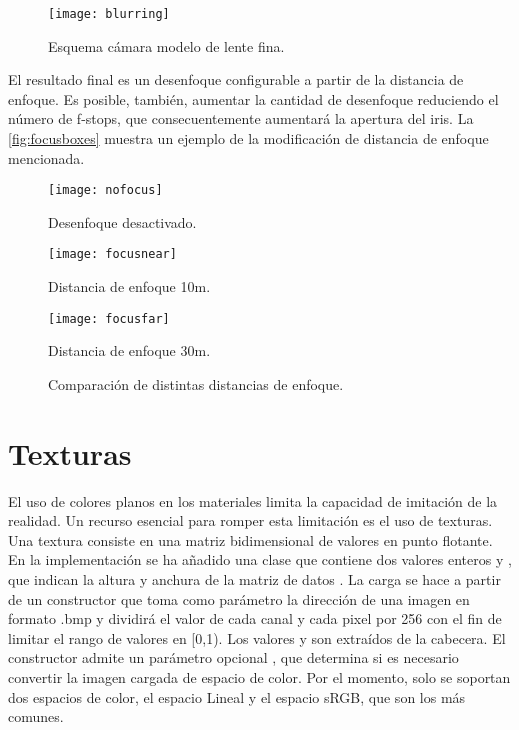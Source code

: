 \begin{figure}[H]
	\centering
	\texttt{[image: blurring]}
	\caption{Esquema cámara modelo de lente fina.}
	\label{fig:thinlensecamera}
\end{figure}

El resultado final es un desenfoque configurable a partir de la distancia de enfoque. Es posible, también, aumentar la cantidad de desenfoque reduciendo el número de f-stops, que consecuentemente aumentará la apertura del iris. La \autoref{fig:focusboxes} muestra un ejemplo de la modificación de distancia de enfoque mencionada.

\begin{figure}[H]
	\centering
  \begin{minipage}[b]{0.3\textwidth}
	\texttt{[image: nofocus]}
	\caption{Desenfoque desactivado.}
  \end{minipage}
  \hfill
  \begin{minipage}[b]{0.3\textwidth}
	\texttt{[image: focusnear]}
	\caption{Distancia de enfoque 10m.}
  \end{minipage}
  	\hfill
  \begin{minipage}[b]{0.3\textwidth}
	\texttt{[image: focusfar]}
	\caption{Distancia de enfoque 30m.}
  \end{minipage}
\caption{Comparación de distintas distancias de enfoque.}
\label{fig:focusboxes}
\end{figure}
	
		
\section{Texturas}
	
El uso de colores planos en los materiales limita la capacidad de imitación de la realidad. Un recurso esencial para romper esta limitación es el uso de texturas. Una textura consiste en una matriz bidimensional de valores en punto flotante. En la implementación se ha añadido una clase  que contiene dos valores enteros  y , que indican la altura y anchura de la matriz de datos . La carga se hace a partir de un constructor que toma como parámetro la dirección de una imagen en formato .bmp y dividirá el valor de cada canal y cada pixel por 256 con el fin de limitar el rango de valores en [0,1). Los valores  y  son extraídos de la cabecera. El constructor admite un parámetro opcional , que determina si es necesario convertir la imagen cargada de espacio de color. Por el momento, solo se soportan dos espacios de color, el espacio Lineal y el espacio sRGB, que son los más comunes.

